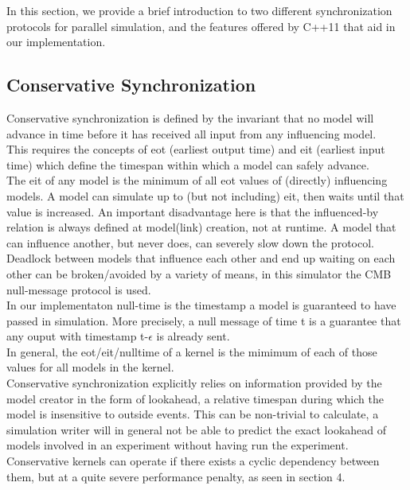 In this section, we provide a brief introduction to two different synchronization protocols for parallel simulation, and the features offered by C++11 that aid in our implementation.

\subsection{Conservative Synchronization}
Conservative synchronization is defined by the invariant that no model will advance in time before it has received all input from any influencing model. \\
This requires the concepts of eot (earliest output time) and eit (earliest input time) which define the timespan within which a model can safely advance. \\ The eit of any model is the minimum of all eot values of (directly) influencing models. A model can simulate up to (but not including) eit, then waits until that value is increased. An important disadvantage here is that the influenced-by relation is always defined at model(link) creation, not at runtime. A model that can influence another, but never does, can severely slow down the protocol.\\ 
Deadlock between models that influence each other and end up waiting on each other can be broken/avoided by a variety of
means, in this simulator the CMB \cite{Chandy:1981:ADS:358598.358613} null-message protocol is used. \\
In our implementaton null-time is the timestamp a model is guaranteed to have passed in simulation. More precisely, a null message of time t is a guarantee that any ouput with timestamp t-$\epsilon$ is already sent.\\
In general, the eot/eit/nulltime of a kernel is the mimimum of each of those values for all models in the kernel.\\
Conservative synchronization explicitly relies on information provided by the model creator in the form of lookahead, a relative timespan during which the model is insensitive to outside events. This can be non-trivial to calculate, a simulation writer will in general not be able to predict the exact lookahead of models involved in an experiment without having run the experiment.\\ Conservative kernels can operate if there exists a cyclic dependency between them, but at a quite severe performance penalty, as seen in section 4.
